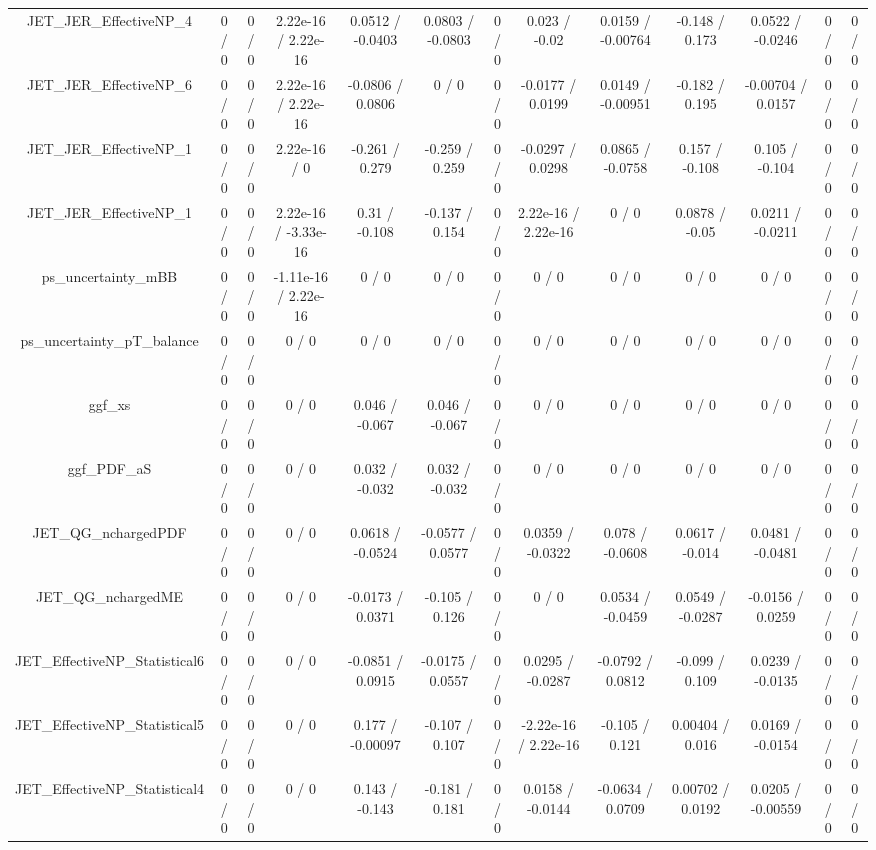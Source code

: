 \documentclass[10pt]{article}
\begin{document}
\begin{table}[htbp]
\begin{center}
\begin{tabular}{|c|c|c|c|c|c|c|c|c|c|c|c|c|}
  JET_JER_EffectiveNP_4 & 0 / 0 & 0 / 0 & 2.22e-16 / 2.22e-16 & 0.0512 / -0.0403 & 0.0803 / -0.0803 & 0 / 0 & 0.023 / -0.02 & 0.0159 / -0.00764 & -0.148 / 0.173 & 0.0522 / -0.0246 & 0 / 0 & 0 / 0 \\ 
  JET_JER_EffectiveNP_6 & 0 / 0 & 0 / 0 & 2.22e-16 / 2.22e-16 & -0.0806 / 0.0806 & 0 / 0 & 0 / 0 & -0.0177 / 0.0199 & 0.0149 / -0.00951 & -0.182 / 0.195 & -0.00704 / 0.0157 & 0 / 0 & 0 / 0 \\ 
  JET_JER_EffectiveNP_1 & 0 / 0 & 0 / 0 & 2.22e-16 / 0 & -0.261 / 0.279 & -0.259 / 0.259 & 0 / 0 & -0.0297 / 0.0298 & 0.0865 / -0.0758 & 0.157 / -0.108 & 0.105 / -0.104 & 0 / 0 & 0 / 0 \\ 
  JET_JER_EffectiveNP_1 & 0 / 0 & 0 / 0 & 2.22e-16 / -3.33e-16 & 0.31 / -0.108 & -0.137 / 0.154 & 0 / 0 & 2.22e-16 / 2.22e-16 & 0 / 0 & 0.0878 / -0.05 & 0.0211 / -0.0211 & 0 / 0 & 0 / 0 \\ 
  ps_uncertainty_mBB & 0 / 0 & 0 / 0 & -1.11e-16 / 2.22e-16 & 0 / 0 & 0 / 0 & 0 / 0 & 0 / 0 & 0 / 0 & 0 / 0 & 0 / 0 & 0 / 0 & 0 / 0 \\ 
  ps_uncertainty_pT_balance & 0 / 0 & 0 / 0 & 0 / 0 & 0 / 0 & 0 / 0 & 0 / 0 & 0 / 0 & 0 / 0 & 0 / 0 & 0 / 0 & 0 / 0 & 0 / 0 \\ 
  ggf_xs & 0 / 0 & 0 / 0 & 0 / 0 & 0.046 / -0.067 & 0.046 / -0.067 & 0 / 0 & 0 / 0 & 0 / 0 & 0 / 0 & 0 / 0 & 0 / 0 & 0 / 0 \\ 
  ggf_PDF_aS & 0 / 0 & 0 / 0 & 0 / 0 & 0.032 / -0.032 & 0.032 / -0.032 & 0 / 0 & 0 / 0 & 0 / 0 & 0 / 0 & 0 / 0 & 0 / 0 & 0 / 0 \\ 
  JET_QG_nchargedPDF & 0 / 0 & 0 / 0 & 0 / 0 & 0.0618 / -0.0524 & -0.0577 / 0.0577 & 0 / 0 & 0.0359 / -0.0322 & 0.078 / -0.0608 & 0.0617 / -0.014 & 0.0481 / -0.0481 & 0 / 0 & 0 / 0 \\ 
  JET_QG_nchargedME & 0 / 0 & 0 / 0 & 0 / 0 & -0.0173 / 0.0371 & -0.105 / 0.126 & 0 / 0 & 0 / 0 & 0.0534 / -0.0459 & 0.0549 / -0.0287 & -0.0156 / 0.0259 & 0 / 0 & 0 / 0 \\ 
  JET_EffectiveNP_Statistical6 & 0 / 0 & 0 / 0 & 0 / 0 & -0.0851 / 0.0915 & -0.0175 / 0.0557 & 0 / 0 & 0.0295 / -0.0287 & -0.0792 / 0.0812 & -0.099 / 0.109 & 0.0239 / -0.0135 & 0 / 0 & 0 / 0 \\ 
  JET_EffectiveNP_Statistical5 & 0 / 0 & 0 / 0 & 0 / 0 & 0.177 / -0.00097 & -0.107 / 0.107 & 0 / 0 & -2.22e-16 / 2.22e-16 & -0.105 / 0.121 & 0.00404 / 0.016 & 0.0169 / -0.0154 & 0 / 0 & 0 / 0 \\ 
  JET_EffectiveNP_Statistical4 & 0 / 0 & 0 / 0 & 0 / 0 & 0.143 / -0.143 & -0.181 / 0.181 & 0 / 0 & 0.0158 / -0.0144 & -0.0634 / 0.0709 & 0.00702 / 0.0192 & 0.0205 / -0.00559 & 0 / 0 & 0 / 0 \\ 

\end{tabular}
\end{center}
\end{table}
\end{document}
